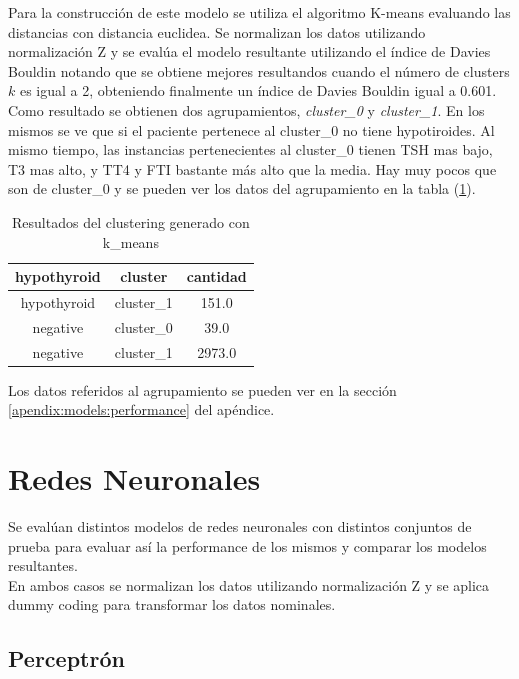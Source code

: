 \documentclass[osajnl,twocolumn,showpacs,superscriptaddress,10pt,floatfix]{revtex4-1} %
\begin{document}
Para la construcción de este modelo se utiliza el algoritmo K-means evaluando las distancias con distancia euclidea. Se normalizan los datos utilizando normalización Z y se evalúa el modelo resultante utilizando el índice de Davies Bouldin notando que se obtiene mejores resultandos cuando el número de clusters $k$ es igual a 2, obteniendo finalmente un índice de Davies Bouldin igual a 0.601. \\

Como resultado se obtienen dos agrupamientos, \textit{cluster\_0} y \textit{cluster\_1}. En los mismos se ve que si el paciente pertenece al cluster\_0 no tiene hypotiroides. Al mismo tiempo, las instancias pertenecientes al cluster\_0 tienen TSH mas bajo, T3 mas alto, y TT4 y FTI bastante más alto que la media. Hay muy pocos que son de cluster\_0 y se pueden ver los datos del agrupamiento en la tabla (\ref{table:k_means}).


\begin{table}[h!]
    \centering
    \begin{tabular}{ccc}
        hypothyroid & cluster & cantidad \\
        \hline
        hypothyroid & cluster\_1 & 151.0 \\
        negative & cluster\_0 & 39.0 \\
        negative  & cluster\_1 & 2973.0 \\
        \hline
    \end{tabular}
    \caption{Resultados del clustering generado con k\_means}
    \label{table:k_means}
\end{table}

Los datos referidos al agrupamiento se pueden ver  en la sección \ref{apendix:models:performance} del apéndice. \\

\section{Redes Neuronales}

Se evalúan distintos modelos de redes neuronales con distintos conjuntos de prueba para evaluar así la performance de los mismos y comparar los modelos resultantes. \\

En ambos casos se normalizan los datos utilizando normalización Z y se aplica dummy coding para transformar los datos nominales. \\

\subsection{Perceptrón}
\end{document}
